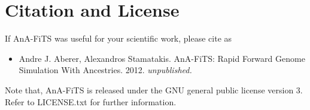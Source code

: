 \documentclass{scrartcl}
\begin{document}
\section{Citation and License }
\label{sec:citation}

If AnA-FiTS was useful for your scientific work, please cite as 

\begin{itemize}
\item Andre J. Aberer, Alexandros Stamatakis. AnA-FiTS: Rapid Forward
  Genome Simulation With Ancestries. 2012. \textit{unpublished.}
\end{itemize}


\noindent Note that, AnA-FiTS is released under the GNU general public
license version 3. Refer to LICENSE.txt for further information. 
\end{document}

